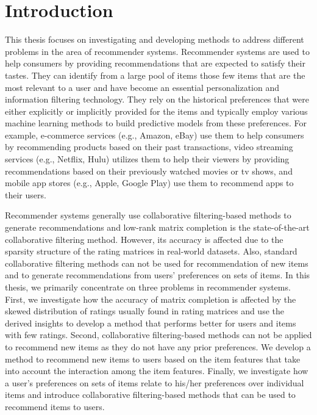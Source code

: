 \chapter{Introduction}
\label{ch:intro}

This thesis focuses on investigating and developing methods to address
different problems in the area of recommender systems. 
Recommender systems are used to help consumers by providing recommendations
that are expected to satisfy their tastes. 
They can identify from a large pool of items those few
items that are the most relevant to a user and have become an essential
personalization and information filtering technology. They rely on the historical
preferences that were either explicitly or implicitly provided for the items and
typically employ various machine learning methods to build predictive models from
these preferences. 
For example, e-commerce services (e.g., Amazon, eBay) use them to help consumers by
recommending products based on their past transactions, video streaming services
(e.g., Netflix, Hulu) utilizes them to help their viewers by providing
recommendations based on their
previously watched movies or tv shows, and mobile app stores (e.g., Apple, Google Play)
use them to recommend apps to their users.

Recommender systems generally use collaborative filtering-based methods to generate recommendations
and low-rank matrix completion is the state-of-the-art collaborative filtering method.
However, its accuracy is affected due to the sparsity structure of
the rating matrices in real-world datasets.  Also, standard collaborative filtering methods can not be used for recommendation of new items and to generate recommendations from users' preferences on sets of items.
In this thesis, we primarily concentrate on three problems in recommender systems. 
First, we investigate how the accuracy of matrix completion is affected by the skewed distribution of ratings usually found in rating matrices and use the derived insights to develop a method that performs better for users and items with few ratings. 
Second, collaborative filtering-based methods can not be applied to recommend new items as they do not have any prior preferences. We develop a method to recommend new items to users based on the item features that take into account the interaction among the item features. 
Finally, we investigate how a user's preferences on sets of items relate to his/her preferences over individual items and introduce collaborative filtering-based methods that can be used to recommend items to users.

